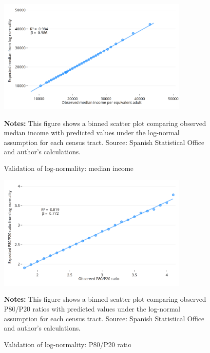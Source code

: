 \begin{figure}[H]
\begin{center}
\captionsetup{justification=centering}
\caption{Validation of log-normality: median income}
\label{fig:median}
\includegraphics[width=0.85\textwidth]{output/binned_scatter_median_2023.png}
\end{center}
\begin{fignotes2}
\textbf{Notes:} This figure shows a binned scatter plot comparing observed median income with predicted values under the log-normal assumption for each census tract. Source: Spanish Statistical Office and author's calculations.
\end{fignotes2}
\end{figure}

\begin{figure}[H]
\begin{center}
\captionsetup{justification=centering}
\caption{Validation of log-normality: P80/P20 ratio}
\label{fig:p80p20}
\includegraphics[width=0.85\textwidth]{output/binned_scatter_p80p20_2023.png}
\end{center}
\begin{fignotes2}
\textbf{Notes:} This figure shows a binned scatter plot comparing observed P80/P20 ratios with predicted values under the log-normal assumption for each census tract. Source: Spanish Statistical Office and author's calculations.
\end{fignotes2}
\end{figure}

